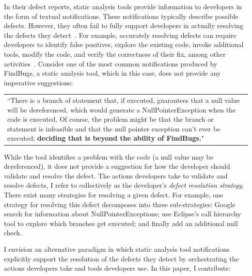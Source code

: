 \documentclass{sig-alternate}
\begin{document}
In their defect reports, static analysis tools provide information to developers in the form of textual notifications.
These notifications typically describe possible defects.
However, they often fail to fully support developers in actually resolving the defects they detect~\cite{Johnson2013}.
For example, accurately resolving defects can require developers to identify false positives, explore the existing code, invoke additional tools, modify the code, and verify the correctness of their fix, among other activities~\cite{Smith2015}.  
Consider one of the most common \cite{Ayewah2007} notifications produced by FindBugs, a static analysis tool, which in this case, does not provide any imperative suggestions:


\vspace{2mm}

\begin{tabular}{|p{7.5cm}}
	``There is a branch of statement that, if executed, guarantees that a null value will be dereferenced, which would generate a NullPointerException when the code is executed. Of course, the problem might be that the branch or statement is infeasible and that the null pointer exception can't ever be executed; \textbf{deciding that is beyond the ability of FindBugs.}"\\
\end{tabular}
\vspace{2mm}

\noindent
While the tool identifies a problem with the code (a null value may be dereferenced), it does not provide a suggestion for how the developer should validate and resolve the defect.
The actions developers take to validate and resolve defects, I refer to collectively as the developer's \textit{defect resolution strategy}.
There exist many strategies for resolving a given defect.
For example, one strategy for resolving this defect decomposes into three sub-strategies: Google search for information about NullPointerExceptions; use Eclipse's call hierarchy tool to explore which branches get executed; and finally add an additional null check.

I envision an alternative paradigm in which static analysis tool notifications explicitly support the resolution of the defects they detect by orchestrating the actions developers take and tools developers use.
In this paper, I contribute: 
\end{document}
